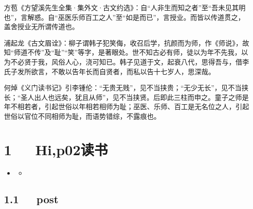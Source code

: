 \documentclass[letterpaper,10pt,english]{sphinxmanual}
\begin{document}
方苞《方望溪先生全集·集外文·古文约选》：自“人非生而知之者”至“吾未见其明也”，言解惑。自“巫医乐师百工之人”至“如是而已”，言授业。而皆以传道贯之，盖舍授业无所谓传道也。

浦起龙《古文眉诠》：柳子谓韩子犯笑侮，收召后学，抗颜而为师，作《师说》，故知“师道不传”及“耻”“笑”等字，是著眼处。世不知古必有师，徒以为年不先我，以为不必贤于我，风俗人心，浇可知已。韩子见道于文，起衰八代，思得吾与，借李氏子发所欲言，不敢以告年长而自贤者，而私以告十七岁人，思深哉。

何焯《义门读书记》引李锺伦：“无贵无贱”，见不当挟贵；“无少无长”，见不当挟长；“圣人出人也远矣，犹且从师”，见不当挟贤。后即此三柱而申之。童子之师是年不相若者，引起世俗以年相若相师为耻；巫医、乐师、百工是无名位之人，引起世俗以官位不同相师为耻，而语势错综，不露痕也。


\chapter{1   Hi,p02读书}
\label{\detokenize{p02_u8bfb_u4e66/Hello_uff0cp02_u8bfb_u4e66:hi-p02}}\label{\detokenize{p02_u8bfb_u4e66/Hello_uff0cp02_u8bfb_u4e66::doc}}
\begin{sphinxShadowBox}
\begin{itemize}
\item {} 
\label{\detokenize{p02_u8bfb_u4e66/Hello_uff0cp02_u8bfb_u4e66:id2}}{\hyperref[\detokenize{p02_u8bfb_u4e66/Hello_uff0cp02_u8bfb_u4e66:hi-p02}]{}}
\begin{itemize}
\item {} 
\label{\detokenize{p02_u8bfb_u4e66/Hello_uff0cp02_u8bfb_u4e66:id3}}{\hyperref[\detokenize{p02_u8bfb_u4e66/Hello_uff0cp02_u8bfb_u4e66:post}]{}}

\end{itemize}

\end{itemize}
\end{sphinxShadowBox}


\section{1.1   post}
\label{\detokenize{p02_u8bfb_u4e66/Hello_uff0cp02_u8bfb_u4e66:post}}
\end{document}
